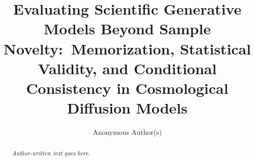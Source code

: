 \documentclass{article}
\title{Evaluating Scientific Generative Models Beyond Sample Novelty:\
Memorization, Statistical Validity, and Conditional Consistency in
Cosmological Diffusion Models}
\author{Anonymous Author(s)}
\newcommand{\draftplaceholder}{\emph{Author-written text goes here.}}
\begin{document}
\maketitle

\begin{abstract}
\draftplaceholder
\end{abstract}













\appendix

\end{document}
